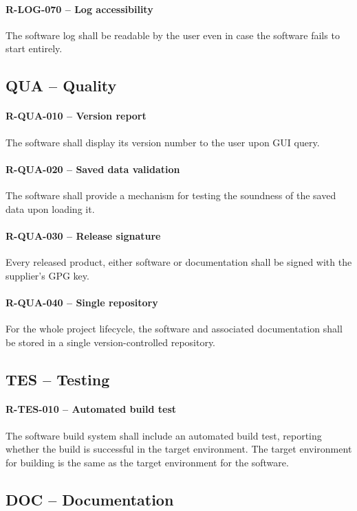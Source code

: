 \paragraph{R-LOG-070 -- Log accessibility}
The software log shall be readable by the user even in case the software
fails to start entirely.

\subsection{QUA -- Quality}
\paragraph{R-QUA-010 -- Version report}
The software shall display its version number to the user upon GUI query.

\paragraph{R-QUA-020 -- Saved data validation}
The software shall provide a mechanism for testing the soundness of the
saved data upon loading it.

\paragraph{R-QUA-030 -- Release signature}
Every released product, either software or documentation shall be signed
with the supplier's GPG key.

\paragraph{R-QUA-040 -- Single repository}
For the whole project lifecycle, the software and associated documentation shall
be stored in a single version-controlled repository.

\subsection{TES -- Testing}
\paragraph{R-TES-010 -- Automated build test}
The software build system shall include an automated build test, reporting
whether the build is successful in the target environment.
The target environment for building is the same as the target environment for
the software.

\subsection{DOC -- Documentation}

